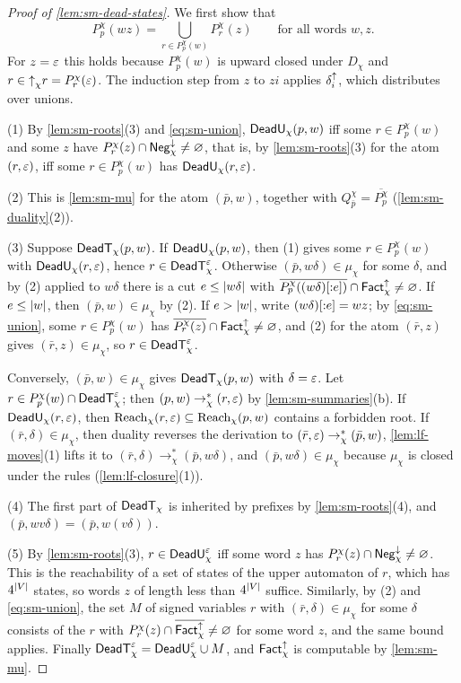 \begin{proof}[Proof of \cref{lem:sm-dead-states}]
We first show that
\begin{equation}\label{eq:sm-union}
 P^\chi_p(wz)=\bigcup_{r\in P^\chi_p(w)}P^\chi_r(z)\qquad\text{for all words }w,z.
\end{equation}
For $z=\varepsilon$ this holds because $P^\chi_p(w)$ is upward closed under $D_\chi$
and $r\in\mathord{\uparrow}_{\chi} r=P^\chi_r(\varepsilon)$. The induction step from $z$ to $zi$ applies
$\delta^{\uparrow}_{i}$, which distributes over unions.

(1) By \cref{lem:sm-roots}(3) and \cref{eq:sm-union}, $\mathsf{DeadU}_\chi(p,w)$ iff
some $r\in P^\chi_p(w)$ and some $z$ have
$P^\chi_r(z)\cap\mathsf{Neg}^{\downarrow}_{\chi}\ne\varnothing$, that is, by \cref{lem:sm-roots}(3)
for the atom $(r,\varepsilon)$, iff some $r\in P^\chi_p(w)$ has
$\mathsf{DeadU}_\chi(r,\varepsilon)$.

(2) This is \cref{lem:sm-mu} for the atom $(\bar p,w)$, together with
$Q^\chi_{\bar p}=\overline{P^\chi_p}$ (\cref{lem:sm-duality}(2)).

(3) Suppose $\mathsf{DeadT}_\chi(p,w)$. If $\mathsf{DeadU}_\chi(p,w)$, then (1) gives some
$r\in P^\chi_p(w)$ with $\mathsf{DeadU}_\chi(r,\varepsilon)$, hence $r\in\mathsf{DeadT}^\varepsilon_\chi$.
Otherwise $(\bar p,w\delta)\in\mu_\chi$ for some $\delta$, and by (2) applied to
$w\delta$ there is a cut $e\le\lvert w\delta\rvert$ with
$\overline{P^\chi_p((w\delta)[{:}e])}\cap\mathsf{Fact}^{\uparrow}_{\chi}\ne\varnothing$. If
$e\le\lvert w\rvert$, then $(\bar p,w)\in\mu_\chi$ by (2). If $e>\lvert w\rvert$, write
$(w\delta)[{:}e]=wz$; by \cref{eq:sm-union}, some $r\in P^\chi_p(w)$ has
$\overline{P^\chi_r(z)}\cap\mathsf{Fact}^{\uparrow}_{\chi}\ne\varnothing$, and (2) for the atom
$(\bar r,z)$ gives $(\bar r,z)\in\mu_\chi$, so $r\in\mathsf{DeadT}^\varepsilon_\chi$.

Conversely, $(\bar p,w)\in\mu_\chi$ gives $\mathsf{DeadT}_\chi(p,w)$ with $\delta=\varepsilon$.
Let $r\in P^\chi_p(w)\cap\mathsf{DeadT}^\varepsilon_\chi$; then $(p,w)\to^*_\chi(r,\varepsilon)$ by
\cref{lem:sm-summaries}(b). If $\mathsf{DeadU}_\chi(r,\varepsilon)$, then
$\operatorname{Reach}_\chi(r,\varepsilon)\subseteq\operatorname{Reach}_\chi(p,w)$ contains a forbidden root. If
$(\bar r,\delta)\in\mu_\chi$, then duality reverses the derivation to
$(\bar r,\varepsilon)\to^*_\chi(\bar p,w)$, \cref{lem:lf-moves}(1) lifts it to
$(\bar r,\delta)\to^*_\chi(\bar p,w\delta)$, and $(\bar p,w\delta)\in\mu_\chi$
because $\mu_\chi$ is closed under the rules (\cref{lem:lf-closure}(1)).

(4) The first part of $\mathsf{DeadT}_\chi$ is inherited by prefixes by
\cref{lem:sm-roots}(4), and $(\bar p,wv\delta)=(\bar p,w(v\delta))$.

(5) By \cref{lem:sm-roots}(3), $r\in\mathsf{DeadU}^\varepsilon_\chi$ iff some word $z$ has
$P^\chi_r(z)\cap\mathsf{Neg}^{\downarrow}_{\chi}\ne\varnothing$. This is the reachability of a set of
states of the upper automaton of $r$, which has $4^{\lvert V\rvert}$ states, so words
$z$ of length less than $4^{\lvert V\rvert}$ suffice. Similarly, by (2) and
\cref{eq:sm-union}, the set $M$ of signed variables $r$ with
$(\bar r,\delta)\in\mu_\chi$ for some $\delta$ consists of the $r$ with
$P^\chi_r(z)\cap\overline{\mathsf{Fact}^{\uparrow}_{\chi}}\ne\varnothing$ for some word $z$, and the
same bound applies. Finally $\mathsf{DeadT}^\varepsilon_\chi=\mathsf{DeadU}^\varepsilon_\chi\cup M$, and
$\mathsf{Fact}^{\uparrow}_{\chi}$ is computable by \cref{lem:sm-mu}.
\end{proof}

